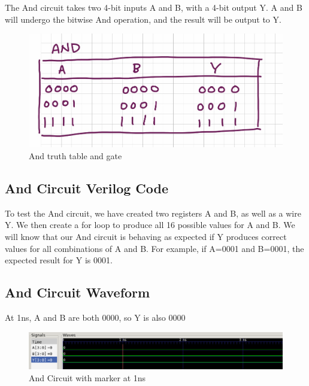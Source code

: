 \documentclass[12pt]{article}
\begin{document}
The And circuit takes two 4-bit inputs A and B, with a 4-bit output Y. A and B will undergo the bitwise And operation, and the result will be output to Y.

\begin{figure}[H]
    \centering
    \includegraphics[width = 1.0\textwidth]{And/and-truth.jpeg}
    \caption{And truth table and gate}
    \label{fig:shift-table}
\end{figure}

\subsection{And Circuit Verilog Code} 
 

To test the And circuit, we have created two registers A and B, as well as a wire Y. We then create a for loop to produce all 16 possible values for A and B. We will know that our And circuit is behaving as expected if Y produces correct values for all combinations of A and B. For example, if A=0001 and B=0001, the expected result for Y is 0001. 
 

\subsection{And Circuit Waveform} 

At 1ns, A and B are both 0000, so Y is also 0000
\begin{figure}[H]
 \centering
 \includegraphics[width = 1.0\textwidth]{And/and_wave.png}
 \caption{And Circuit with marker at 1ns}
 \label{fig:enter-label} 
\end{figure} 
\end{document}
